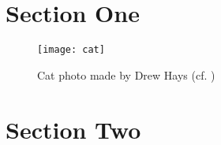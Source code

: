 \section{Section One}
\label{sec:section_one}

\begin{figure}[H]
    \centering
    \texttt{[image: cat]}
    \caption[Cat photo]{Cat photo made by Drew Hays (cf. \cite{Hays_2025})}
    \label{fig:cat}
\end{figure}

\section{Section Two}
\label{sec:section_two}


